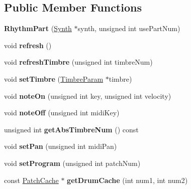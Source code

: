 \subsection*{Public Member Functions}
\begin{DoxyCompactItemize}
\item 
\hypertarget{classMT32Emu_1_1RhythmPart_a915268069269a4292331aa52ca8af564}{{\bfseries Rhythm\-Part} (\hyperlink{classMT32Emu_1_1Synth}{Synth} $\ast$synth, unsigned int use\-Part\-Num)}\label{classMT32Emu_1_1RhythmPart_a915268069269a4292331aa52ca8af564}

\item 
\hypertarget{classMT32Emu_1_1RhythmPart_aba2aae08b0cd79f37768ecf5c6ff1e6d}{void {\bfseries refresh} ()}\label{classMT32Emu_1_1RhythmPart_aba2aae08b0cd79f37768ecf5c6ff1e6d}

\item 
\hypertarget{classMT32Emu_1_1RhythmPart_adcf67a9d3d1d059d1a7f86a2b100cbf0}{void {\bfseries refresh\-Timbre} (unsigned int timbre\-Num)}\label{classMT32Emu_1_1RhythmPart_adcf67a9d3d1d059d1a7f86a2b100cbf0}

\item 
\hypertarget{classMT32Emu_1_1RhythmPart_aa3a3607c4a3236a05956fdfecd8f11b2}{void {\bfseries set\-Timbre} (\hyperlink{structMT32Emu_1_1TimbreParam}{Timbre\-Param} $\ast$timbre)}\label{classMT32Emu_1_1RhythmPart_aa3a3607c4a3236a05956fdfecd8f11b2}

\item 
\hypertarget{classMT32Emu_1_1RhythmPart_aa3e442480c0f657ab44cb1e42e92a1d4}{void {\bfseries note\-On} (unsigned int key, unsigned int velocity)}\label{classMT32Emu_1_1RhythmPart_aa3e442480c0f657ab44cb1e42e92a1d4}

\item 
\hypertarget{classMT32Emu_1_1RhythmPart_ae5f8498d78b51a3267d4ea39776721a8}{void {\bfseries note\-Off} (unsigned int midi\-Key)}\label{classMT32Emu_1_1RhythmPart_ae5f8498d78b51a3267d4ea39776721a8}

\item 
\hypertarget{classMT32Emu_1_1RhythmPart_af0c0f93043db3b546a32e0e8ea4a3f68}{unsigned int {\bfseries get\-Abs\-Timbre\-Num} () const }\label{classMT32Emu_1_1RhythmPart_af0c0f93043db3b546a32e0e8ea4a3f68}

\item 
\hypertarget{classMT32Emu_1_1RhythmPart_af8279e3faad0bd2bd1182caa3b07628b}{void {\bfseries set\-Pan} (unsigned int midi\-Pan)}\label{classMT32Emu_1_1RhythmPart_af8279e3faad0bd2bd1182caa3b07628b}

\item 
\hypertarget{classMT32Emu_1_1RhythmPart_aa5af09d4067a238145b647bf60aacdcc}{void {\bfseries set\-Program} (unsigned int patch\-Num)}\label{classMT32Emu_1_1RhythmPart_aa5af09d4067a238145b647bf60aacdcc}

\item 
\hypertarget{classMT32Emu_1_1RhythmPart_ad0e23c5ba67594919eb05b80fd13f482}{const \hyperlink{structMT32Emu_1_1PatchCache}{Patch\-Cache} $\ast$ {\bfseries get\-Drum\-Cache} (int num1, int num2)}\label{classMT32Emu_1_1RhythmPart_ad0e23c5ba67594919eb05b80fd13f482}

\end{DoxyCompactItemize}


